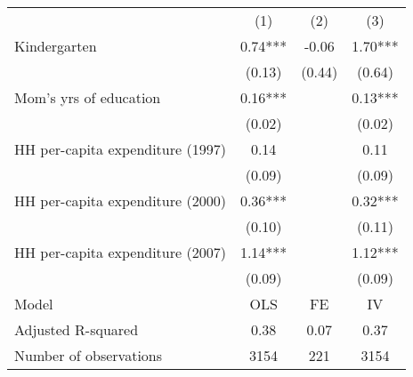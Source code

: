 \begin{tabular}{llll}
\cline{1-4}
\multicolumn{1}{c}{} &
  \multicolumn{1}{c}{(1)} &
  \multicolumn{1}{c}{(2)} &
  \multicolumn{1}{c}{(3)} \\
\cline{1-4}
\multicolumn{1}{l}{Kindergarten} &
  \multicolumn{1}{c}{0.74***} &
  \multicolumn{1}{c}{-0.06 } &
  \multicolumn{1}{c}{1.70***} \\
\multicolumn{1}{l}{} &
  \multicolumn{1}{c}{(0.13)} &
  \multicolumn{1}{c}{(0.44)} &
  \multicolumn{1}{c}{(0.64)} \\
\multicolumn{1}{l}{Mom's yrs of education} &
  \multicolumn{1}{c}{0.16***} &
  \multicolumn{1}{c}{} &
  \multicolumn{1}{c}{0.13***} \\
\multicolumn{1}{l}{} &
  \multicolumn{1}{c}{(0.02)} &
  \multicolumn{1}{c}{} &
  \multicolumn{1}{c}{(0.02)} \\
\multicolumn{1}{l}{HH per-capita expenditure (1997)} &
  \multicolumn{1}{c}{0.14 } &
  \multicolumn{1}{c}{} &
  \multicolumn{1}{c}{0.11 } \\
\multicolumn{1}{l}{} &
  \multicolumn{1}{c}{(0.09)} &
  \multicolumn{1}{c}{} &
  \multicolumn{1}{c}{(0.09)} \\
\multicolumn{1}{l}{HH per-capita expenditure (2000)} &
  \multicolumn{1}{c}{0.36***} &
  \multicolumn{1}{c}{} &
  \multicolumn{1}{c}{0.32***} \\
\multicolumn{1}{l}{} &
  \multicolumn{1}{c}{(0.10)} &
  \multicolumn{1}{c}{} &
  \multicolumn{1}{c}{(0.11)} \\
\multicolumn{1}{l}{HH per-capita expenditure (2007)} &
  \multicolumn{1}{c}{1.14***} &
  \multicolumn{1}{c}{} &
  \multicolumn{1}{c}{1.12***} \\
\multicolumn{1}{l}{} &
  \multicolumn{1}{c}{(0.09)} &
  \multicolumn{1}{c}{} &
  \multicolumn{1}{c}{(0.09)} \\
\multicolumn{1}{l}{Model} &
  \multicolumn{1}{c}{OLS} &
  \multicolumn{1}{c}{FE} &
  \multicolumn{1}{c}{IV} \\
\multicolumn{1}{l}{Adjusted R-squared} &
  \multicolumn{1}{c}{0.38} &
  \multicolumn{1}{c}{0.07} &
  \multicolumn{1}{c}{0.37} \\
\multicolumn{1}{l}{Number of observations} &
  \multicolumn{1}{c}{3154} &
  \multicolumn{1}{c}{221} &
  \multicolumn{1}{c}{3154} \\
\cline{1-4}
\end{tabular}
